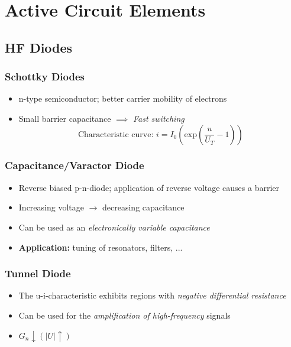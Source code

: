 \section{Active Circuit Elements}
\subsection{HF Diodes}
\subsubsection{Schottky Diodes}
\begin{itemize}
    \itemsep0pt
    \item n-type semiconductor; better carrier mobility of electrons
    \item Small barrier capacitance $\implies$ \textit{Fast switching}
    \begin{equation*}
        \text{Characteristic curve: }i = I_0 \left(\mathrm{exp}\left(\dfrac{u}{U_T} - 1\right)\right)
    \end{equation*}
\end{itemize}

\subsubsection{Capacitance/Varactor Diode}
\begin{itemize}
    \itemsep0pt
    \item Reverse biased p-n-diode; application of reverse voltage causes a barrier
    \item Increasing voltage $\to$ decreasing capacitance
    \item Can be used as an \textit{electronically variable capacitance}
    \item \textbf{Application:} tuning of resonators, filters, ...
\end{itemize}

\subsubsection{Tunnel Diode}
\begin{itemize}
    \itemsep0pt
    \item The u-i-characteristic exhibits regions with \textit{negative differential resistance}
    \item Can be used for the \textit{amplification of high-frequency} signals
    \item \(G_{n} \downarrow \left(|U|\uparrow \right)\)
\end{itemize}

